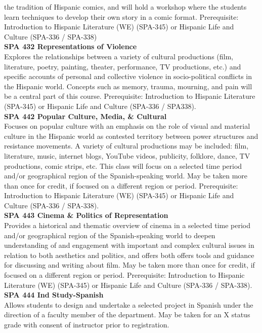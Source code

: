 \documentclass[
  letterpaper,
]{scrbook}
\begin{document}
the tradition of Hispanic comics, and will hold a workshop where the
students learn techniques to develop their own story in a comic format.
Prerequisite: Introduction to Hispanic Literature (WE) (SPA-345) or
Hispanic Life and Culture (SPA-336 / SPA-338)\\
\textbf{SPA 432 Representations of Violence}\\
Explores the relationships between a variety of cultural productions
(film, literature, poetry, painting, theater, performance, TV
productions, etc.) and specific accounts of personal and collective
violence in socio-political conflicts in the Hispanic world. Concepts
such as memory, trauma, mourning, and pain will be a central part of
this course. Prerequisite: Introduction to Hispanic Literature (SPA-345)
or Hispanic Life and Culture (SPA-336 / SPA338).\\
\textbf{SPA 442 Popular Culture, Media, \& Cultural}\\
Focuses on popular culture with an emphasis on the role of visual and
material culture in the Hispanic world as contested territory between
power structures and resistance movements. A variety of cultural
productions may be included: film, literature, music, internet blogs,
YouTube videos, publicity, folklore, dance, TV productions, comic
strips, etc. This class will focus on a selected time period and/or
geographical region of the Spanish-speaking world. May be taken more
than once for credit, if focused on a different region or period.
Prerequisite: Introduction to Hispanic Literature (WE) (SPA-345) or
Hispanic Life and Culture (SPA-336 / SPA-338).\\
\textbf{SPA 443 Cinema \& Politics of Representation}\\
Provides a historical and thematic overview of cinema in a selected time
period and/or geographical region of the Spanish-speaking world to
deepen understanding of and engagement with important and complex
cultural issues in relation to both aesthetics and politics, and offers
both offers tools and guidance for discussing and writing about film.
May be taken more than once for credit, if focused on a different region
or period. Prerequisite: Introduction to Hispanic Literature (WE)
(SPA-345) or Hispanic Life and Culture (SPA-336 / SPA-338).\\
\textbf{SPA 444 Ind Study-Spanish}\\
Allows students to design and undertake a selected project in Spanish
under the direction of a faculty member of the department. May be taken
for an X status grade with consent of instructor prior to registration.
\end{document}
